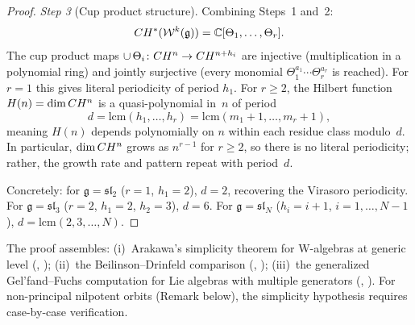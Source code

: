 \begin{proof}
\emph{Step 3} (Cup product structure).
Combining Steps~1 and~2:
\[CH^*(\mathcal{W}^k(\mathfrak{g}))
= \mathbb{C}[\Theta_1, \ldots, \Theta_r].\]
The cup product maps
$\cup\,\Theta_i\colon CH^n \to CH^{n+h_i}$
are injective (multiplication in a polynomial ring) and jointly surjective
(every monomial $\Theta_1^{a_1}\cdots\Theta_r^{a_r}$ is reached).
For $r = 1$ this gives literal periodicity of period $h_1$.
For $r \geq 2$, the Hilbert function $H(n) = \dim CH^n$
is a quasi-polynomial in~$n$ of period
\[d = \mathrm{lcm}(h_1, \ldots, h_r) = \mathrm{lcm}(m_1+1, \ldots, m_r+1),\]
meaning $H(n)$ depends polynomially on $n$ within each residue class
modulo~$d$.  In particular, $\dim CH^n$ grows as $n^{r-1}$
for $r \geq 2$, so there is no literal periodicity; rather, the growth
rate and pattern repeat with period~$d$.

Concretely: for $\mathfrak{g} = \mathfrak{sl}_2$ ($r = 1$, $h_1 = 2$),
$d = 2$, recovering the Virasoro periodicity.  For
$\mathfrak{g} = \mathfrak{sl}_3$ ($r = 2$, $h_1 = 2$, $h_2 = 3$),
$d = 6$.  For $\mathfrak{g} = \mathfrak{sl}_N$ ($h_i = i+1$, $i = 1,
\ldots, N-1$), $d = \mathrm{lcm}(2, 3, \ldots, N)$.
\end{proof}

\begin{remark}[Scope]
The proof assembles: (i)~Arakawa's simplicity theorem for W-algebras at
generic level (\ClaimStatusProvedElsewhere, \cite{Ara07});
(ii)~the Beilinson--Drinfeld comparison (\ClaimStatusProvedElsewhere, \cite{BD04});
(iii)~the generalized Gel'fand--Fuchs computation for Lie algebras with
multiple generators (\ClaimStatusProvedElsewhere, \cite{Fuks86}).  For
non-principal nilpotent orbits (Remark below), the simplicity hypothesis
requires case-by-case verification.
\end{remark}

